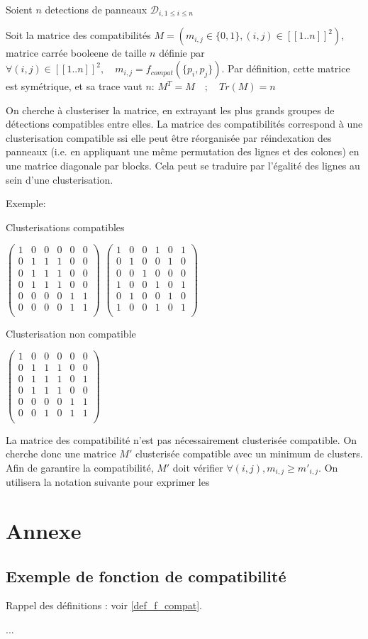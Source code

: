 \documentclass{article}
\begin{document}
Soient \(n\) detections de panneaux \(\mathscr{D}_{i, 1\leq i\leq n}\)

Soit la matrice des compatibilités \(M = (m_{i,j} \in \{0, 1\}, (i, j) \in [\![1..n]\!]^{2})\), matrice carrée booleene de taille \(n\) définie par \(\forall (i, j) \in [\![1..n]\!]^{2}, \quad m_{i,j} = f_{compat}(\{p_{i}, p_{j}\})\). Par définition, cette matrice est symétrique, et sa trace vaut \(n\): \(M^{T} = M \quad ; \quad Tr(M) = n\)

On cherche à clusteriser la matrice, en extrayant les plus grands groupes de détections compatibles entre elles.
La matrice des compatibilités correspond à une clusterisation compatible ssi elle peut être réorganisée par réindexation des panneaux (i.e. en appliquant une même permutation des lignes et des colones) en une matrice diagonale par blocks. Cela peut se traduire par l'égalité des lignes au sein d'une clusterisation.

Exemple:

Clusterisations compatibles

\(\begin{pmatrix}
	1&0&0&0&0&0	\\
	0&1&1&1&0&0	\\
	0&1&1&1&0&0	\\
	0&1&1&1&0&0	\\
	0&0&0&0&1&1	\\
	0&0&0&0&1&1	\\
\end{pmatrix}\)
\(\begin{pmatrix}
	1&0&0&1&0&1	\\
	0&1&0&0&1&0	\\
	0&0&1&0&0&0	\\
	1&0&0&1&0&1	\\
	0&1&0&0&1&0	\\
	1&0&0&1&0&1	\\
\end{pmatrix}\)

Clusterisation non compatible

\(\begin{pmatrix}
	1&0&0&0&0&0	\\
	0&1&1&1&0&0	\\
	0&1&1&1&0&1	\\
	0&1&1&1&0&0	\\
	0&0&0&0&1&1	\\
	0&0&1&0&1&1	\\
\end{pmatrix}\)

La matrice des compatibilité n'est pas nécessairement clusterisée compatible. On cherche donc une matrice \(M'\) clusterisée compatible avec un minimum de clusters. Afin de garantire la compatibilité, \(M'\) doit vérifier \(\forall (i,j), m_{i,j} \geq m'_{i,j}\). On utilisera la notation suivante pour exprimer les 

\section{Annexe}

\subsection{Exemple de fonction de compatibilité}

\label{ex_f_compat}
Rappel des définitions : voir \ref{def_f_compat}.

...
\end{document}
